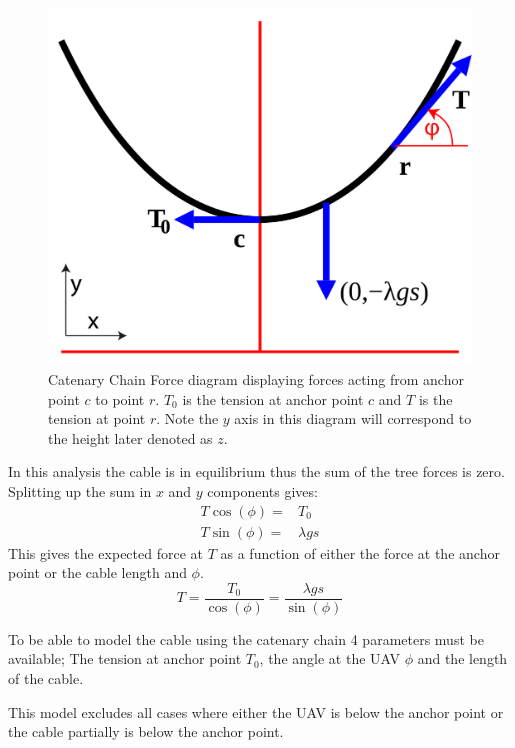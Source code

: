 \begin{figure}[H]
\centering
\includegraphics[scale=0.25]{graphics/CatenaryForceDiagram.png}
\caption[Catenary Chain Force diagram]{Catenary Chain Force diagram displaying forces acting from anchor point $c$ to point $r$. $T_0$ is the tension at anchor point $c$ and $T$ is the tension at point $r$. Note the $y$ axis in this diagram will correspond to the height later denoted as $z$.}
\label{fig:catenary_force_diagram}
\end{figure}

\noindent
In this analysis the cable is in equilibrium thus the sum of the tree forces is zero. Splitting up the sum in $x$ and $y$ components gives:
\begin{eqnarray}
T\cos(\phi) =& T_0 \\
T \sin(\phi) =& \lambda g s
\end{eqnarray}
This gives the expected force at $T$ as a function of either the force at the anchor point or the cable length and $\phi$.
\begin{equation}
T = \frac{T_0}{\cos(\phi)} = \frac{\lambda g s}{\sin(\phi)}
\end{equation}

To be able to model the cable using the catenary chain 4 parameters must be available; The tension at anchor point $T_0$, the angle at the UAV $\phi$ and the length of the cable.

\noindent
This model excludes all cases where either the UAV is below the anchor point or the cable partially is below the anchor point.



